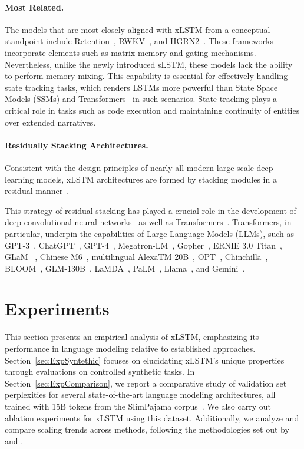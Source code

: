 \paragraph{Most Related.} The models that are most closely aligned with xLSTM from a conceptual standpoint include Retention~\citep{Sun:23arxiv}, RWKV~\citep{Peng:23arxivshort,Peng:24arxivshort}, and HGRN2~\citep{Qin:24arxiv}. These frameworks incorporate elements such as matrix memory and gating mechanisms. Nevertheless, unlike the newly introduced sLSTM, these models lack the ability to perform memory mixing. This capability is essential for effectively handling state tracking tasks, which renders LSTMs more powerful than State Space Models (SSMs) and Transformers~\citep{Merrill:24,Deletang:23} in such scenarios. State tracking plays a critical role in tasks such as code execution and maintaining continuity of entities over extended narratives.

\paragraph{Residually Stacking Architectures.} Consistent with the design principles of nearly all modern large-scale deep learning models, xLSTM architectures are formed by stacking modules in a residual manner~\citep{Srivastava:15,He:16}.

This strategy of residual stacking has played a crucial role in the development of deep convolutional neural networks~\citep{He:16} as well as Transformers~\citep{Vaswani:17}. Transformers, in particular, underpin the capabilities of Large Language Models (LLMs), such as GPT-3~\citep{Brown:20short}, ChatGPT~\citep{Schulman:22short}, GPT-4~\citep{Achiam:23gpt4short}, Megatron-LM~\citep{Shoeybi:19}, Gopher~\citep{Rae:21short}, ERNIE 3.0 Titan~\citep{Wang:21arxivshort}, GLaM ~\citep{Du:21glamshort}, Chinese M6~\citep{Lin:21}, multilingual AlexaTM 20B~\citep{Soltan:22}, OPT~\citep{Zhang:22opt}, Chinchilla~\citep{Hoffmann:22short}, BLOOM~\citep{Scao:22arxivshort}, GLM-130B~\citep{Zeng:22arxivshort}, LaMDA~\citep{Thoppilan:22short}, PaLM~\citep{Chowdhery:22short}, Llama~\citep{Touvron:23arxiv}, and Gemini~\citep{GeminiTeam:23arxiv,Reid:24arxiv}.

\section{Experiments}
\label{sec:Exp}

This section presents an empirical analysis of xLSTM, emphasizing its performance in language modeling relative to established approaches. Section~\ref{sec:ExpSyntethic} focuses on elucidating xLSTM’s unique properties through evaluations on controlled synthetic tasks. In Section~\ref{sec:ExpComparison}, we report a comparative study of validation set perplexities for several state-of-the-art language modeling architectures, all trained with 15B tokens from the SlimPajama corpus~\citep{Soboleva:23}. We also carry out ablation experiments for xLSTM using this dataset. Additionally, we analyze and compare scaling trends across methods, following the methodologies set out by \citet{Kaplan:20} and \citet{Brown:20short}.

